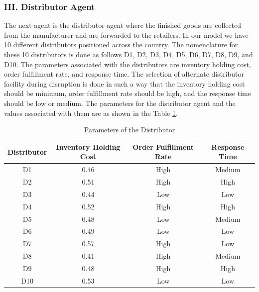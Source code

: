 \subsubsection{III. Distributor Agent}
The next agent is the distributor agent where the finished goods are collected from the manufacturer and are forwarded to the retailers. In our model we have 10 different distributors positioned across the country. The nomenclature for these 10 distributors is done as follows D1, D2, D3, D4, D5, D6, D7, D8, D9, and D10. The parameters associated with the distributors are inventory holding cost, order fulfillment rate, and response time. The selection of alternate distributor facility during disruption is done in such a way that the inventory holding cost should be minimum, order fulfillment rate should be high, and the response time should be low or medium. The parameters for the distributor agent and the values associated with them are as shown in the Table \ref{tab:Distributor}.


\begin{table}[H]
\caption{Parameters of the Distributor}
\label{tab:Distributor}
\begin{center}
\begin{tabular}[b]{|c|c|c|c|}
	\hline
	Distributor & Inventory Holding Cost & Order Fulfillment Rate & Response Time \\ \hline
	D1 & 0.46 & High & Medium\\ \hline
	D2 & 0.51 & High & High \\ \hline
	D3 & 0.44 & Low & Low \\ \hline
	D4 & 0.52 & High & High \\ \hline
	D5 & 0.48 & Low & Medium \\ \hline
	D6 & 0.49 & Low & Low \\ \hline
	D7 & 0.57 & High & Low \\ \hline
    D8 & 0.41 & High & Medium \\ \hline
    D9 & 0.48 & High & High \\ \hline
    D10 & 0.53 & Low & Low \\ \hline
\end{tabular}
\end{center}
\end{table}

